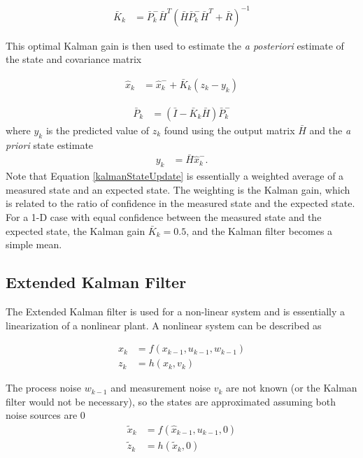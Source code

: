 \begin{align}
\bar{K}_k &=\bar{P}^-_k\bar{H}^T(\bar{H}\bar{P}^-_k\bar{H}^T + \bar{R})^{-1}
\end{align}

This optimal Kalman gain is then used to estimate the \textit{a posteriori} estimate of the state and covariance matrix

\begin{align}
\label{kalmanStateUpdate}
\hat{x}_k &=\hat{x}^-_k+\bar{K}_k(z_k-y_k)
\end{align}

\begin{align}
\bar{P}_k &= (\bar{I}-\bar{K}_k\bar{H})\bar{P}^-_k
\end{align}
\noindent
where $y_k$ is the predicted value of $z_k$ found using the output matrix $\bar{H}$ and the \textit{a priori} state estimate
\begin{align}
y_k &= \bar{H}\hat{x}^-_k.
\end{align}
Note that Equation \ref{kalmanStateUpdate} is essentially a weighted average of a measured state and an expected state. The weighting is the Kalman gain, which is related to the ratio of confidence in the measured state and the expected state. For a 1-D case with equal confidence between the measured state and the expected state, the Kalman gain $\bar{K}_k = 0.5$, and the Kalman filter becomes a simple mean.


\subsection*{Extended Kalman Filter}
\label{EKFTheory}
The Extended Kalman filter is used for a non-linear system and is essentially a linearization of a nonlinear plant. A nonlinear system can be described as \cite{welch1995introduction}

\begin{align}
x_k &= f(x_{k-1},u_{k-1},w_{k-1})\\
z_k &= h(x_k,v_k)
\end{align}

The process noise $w_{k-1}$ and measurement noise $v_k$ are not known (or the Kalman filter would not be necessary), so the states are approximated assuming both noise sources are 0
\begin{align}
\tilde{x}_k &= f(\hat{x}_{k-1},u_{k-1},0)\\
\tilde{z}_k &= h(\tilde{x}_k,0)
\end{align}

